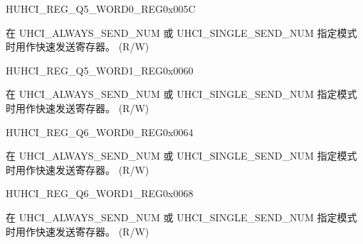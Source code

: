 \begin{register}{H}{UHCI\_REG\_Q5\_WORD0\_REG}{0x005C}\label{regdesc:UHCIREGQ5WORD0REG}
%
\regnewline%
\begin{regdesc}\begin{reglist}
\label{fielddesc:UHCISENDQ5WORD0}\item [UHCI\_SEND\_Q5\_WORD0] 在 UHCI\_ALWAYS\_SEND\_NUM 或 UHCI\_SINGLE\_SEND\_NUM 指定模式时用作快速发送寄存器。 (R/W)
\end{reglist}\end{regdesc}
\end{register}


\begin{register}{H}{UHCI\_REG\_Q5\_WORD1\_REG}{0x0060}\label{regdesc:UHCIREGQ5WORD1REG}
%
\regnewline%
\begin{regdesc}\begin{reglist}
\label{fielddesc:UHCISENDQ5WORD1}\item [UHCI\_SEND\_Q5\_WORD1] 在 UHCI\_ALWAYS\_SEND\_NUM 或 UHCI\_SINGLE\_SEND\_NUM 指定模式时用作快速发送寄存器。 (R/W)
\end{reglist}\end{regdesc}
\end{register}


\begin{register}{H}{UHCI\_REG\_Q6\_WORD0\_REG}{0x0064}\label{regdesc:UHCIREGQ6WORD0REG}
%
\regnewline%
\begin{regdesc}\begin{reglist}
\label{fielddesc:UHCISENDQ6WORD0}\item [UHCI\_SEND\_Q6\_WORD0] 在 UHCI\_ALWAYS\_SEND\_NUM 或 UHCI\_SINGLE\_SEND\_NUM 指定模式时用作快速发送寄存器。 (R/W)
\end{reglist}\end{regdesc}
\end{register}


\begin{register}{H}{UHCI\_REG\_Q6\_WORD1\_REG}{0x0068}\label{regdesc:UHCIREGQ6WORD1REG}
%
\regnewline%
\begin{regdesc}\begin{reglist}
\label{fielddesc:UHCISENDQ6WORD1}\item [UHCI\_SEND\_Q6\_WORD1] 在 UHCI\_ALWAYS\_SEND\_NUM 或 UHCI\_SINGLE\_SEND\_NUM 指定模式时用作快速发送寄存器。 (R/W)
\end{reglist}\end{regdesc}
\end{register}


